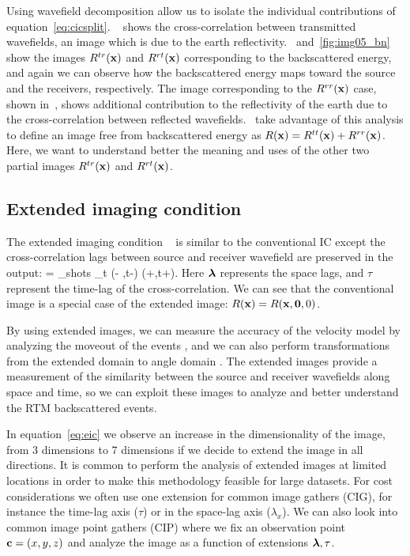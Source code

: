 Using wavefield decomposition allow us to isolate the individual contributions of equation~\ref{eq:cicsplit}. 
~ shows the cross-correlation between transmitted wavefields, an image which is due to the
earth reflectivity.~ and~\ref{fig:img05_bn} show the images $R^{tr}({\bf x})$ and $R^{rt}({\bf x})$ corresponding
to the backscattered energy, and again we can observe how the backscattered energy
maps toward the source and the receivers, respectively. The image corresponding to the $R^{rr}({\bf x})$ case, shown 
in~, shows additional contribution to the reflectivity of the earth due to the cross-correlation
between reflected wavefields.~\cite{fei:3130} take  advantage of this analysis to define an image 
free from backscattered energy as $R({\bf x})=R^{tt}({\bf x})+R^{rr}({\bf x})$. Here,
we want to understand better the meaning and uses of the other two partial images $R^{tr}({\bf x})$ and $R^{rt}({\bf x})$.


\subsection{Extended imaging condition}

The extended imaging condition ~\citep{rickett:883,sava:S209,GPR:GPR888} is similar to the conventional IC except the cross-correlation
lags between source and receiver wavefield are preserved in the output:
\beq
\Re= \sum_{shots} \sum_{t} \US(\xx - \hh,t-\tau) \UR(\xx+\hh,t+\tau).
\label{eq:eic}
\eeq
Here ${\boldsymbol{\lambda}}$ represents the space lags, and $\tau$ represent the time-lag of the cross-correlation.
%
We can see that the conventional image is a special case of the extended image: $R({\bf x})=R({\bf x},{\bf 0},0)$.

By using extended images, we can measure the accuracy of the velocity model by analyzing the moveout of the events
 \citep{yang:S151}, and we can also perform transformations from the extended domain to angle domain 
\citep{sava:1065,sava:S209,sava:S131}. The extended images provide a measurement of the similarity between the source
 and receiver wavefields along space and time, so we can exploit these images to analyze and better understand the RTM backscattered events.

In equation~\ref{eq:eic} we observe an increase in the dimensionality of the image, from 3 dimensions to 7 dimensions
if we decide to extend the image in all directions. It is common to perform the analysis 
of extended images at limited locations in order to make this methodology feasible for large datasets. 
For cost considerations we often use one extension for common image gathers (CIG), for instance
 the time-lag axis ($\tau$) or in the space-lag axis ($\lambda_x$). We can also look into common image point gathers (CIP) where we 
fix an observation point ${\bf c}=(x,y,z)$ and analyze the image as a function of extensions ${\boldsymbol{\lambda}},\tau$. 

